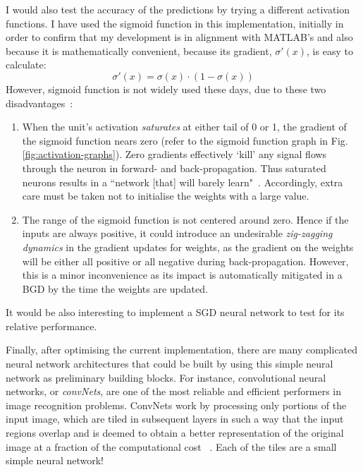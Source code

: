 I would also test the accuracy of the predictions by trying a different activation functions. I have used the sigmoid function in this implementation, initially in order to confirm that my development is in alignment with MATLAB's and also because it is mathematically convenient, because its gradient, $\sigma'(x)$, is easy to calculate:
$$\sigma'(x) = \sigma(x) \cdot (1 - \sigma(x))$$
However, sigmoid function is not widely used these days, due to these two disadvantages~\cite{Kar16}:
\begin{enumerate}
\item When the unit's activation \textit{saturates} at either tail of 0 or 1, the gradient of the sigmoid function nears zero (refer to the sigmoid function graph in Fig. \ref{fig:activation-graphs}). Zero gradients effectively `kill' any signal flows through the neuron in forward- and back-propagation. Thus saturated neurons results in a ``network [that] will barely learn"~\cite{Kar16}. Accordingly, extra care must be taken not to initialise the weights with a large value.
\item The range of the sigmoid function is not centered around zero. Hence if the inputs are always positive, it could introduce an undesirable \textit{zig-zagging dynamics} in the gradient updates for weights, as the gradient on the weights will be either all positive or all negative during back-propagation. However, this is a minor inconvenience as its impact is automatically mitigated in a BGD by the time the weights are updated.
\end{enumerate}

It would be also interesting to implement a SGD neural network to test for its relative performance.

Finally, after optimising the current implementation, there are many complicated neural network architectures that could be built by using this simple neural network as preliminary building blocks. For instance, convolutional neural networks, or \textit{convNets}, are one of the most reliable and efficient performers in image recognition problems. ConvNets work by processing only portions of the input image, which are tiled in subsequent layers in such a way that the input regions overlap and is deemed to obtain a better representation of the original image at a fraction of the computational cost ~\cite{Kar16}. Each of the tiles are a small simple neural network!
